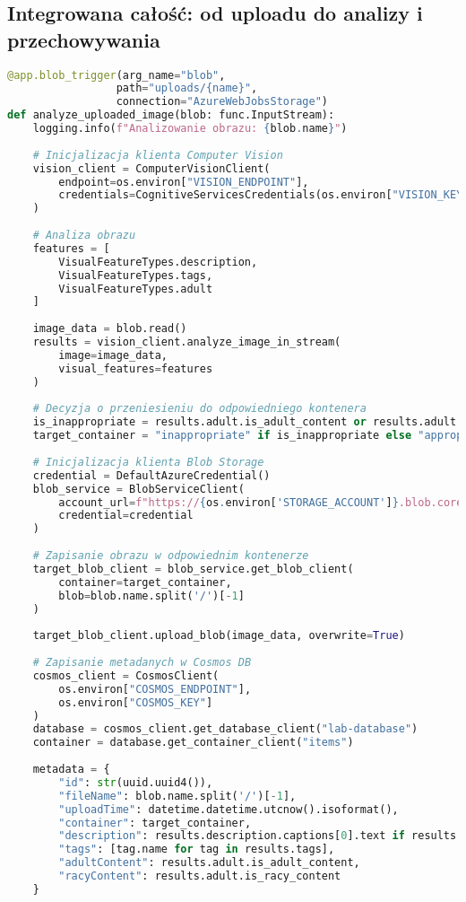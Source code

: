 \documentclass{article}
\begin{document}
\subsection{Integrowana całość: od uploadu do analizy i przechowywania}
\begin{lstlisting}[language=python]
@app.blob_trigger(arg_name="blob", 
                 path="uploads/{name}", 
                 connection="AzureWebJobsStorage")
def analyze_uploaded_image(blob: func.InputStream):
    logging.info(f"Analizowanie obrazu: {blob.name}")
    
    # Inicjalizacja klienta Computer Vision
    vision_client = ComputerVisionClient(
        endpoint=os.environ["VISION_ENDPOINT"],
        credentials=CognitiveServicesCredentials(os.environ["VISION_KEY"])
    )
    
    # Analiza obrazu
    features = [
        VisualFeatureTypes.description,
        VisualFeatureTypes.tags,
        VisualFeatureTypes.adult
    ]
    
    image_data = blob.read()
    results = vision_client.analyze_image_in_stream(
        image=image_data,
        visual_features=features
    )
    
    # Decyzja o przeniesieniu do odpowiedniego kontenera
    is_inappropriate = results.adult.is_adult_content or results.adult.is_racy_content
    target_container = "inappropriate" if is_inappropriate else "appropriate"
    
    # Inicjalizacja klienta Blob Storage
    credential = DefaultAzureCredential()
    blob_service = BlobServiceClient(
        account_url=f"https://{os.environ['STORAGE_ACCOUNT']}.blob.core.windows.net",
        credential=credential
    )
    
    # Zapisanie obrazu w odpowiednim kontenerze
    target_blob_client = blob_service.get_blob_client(
        container=target_container,
        blob=blob.name.split('/')[-1]
    )
    
    target_blob_client.upload_blob(image_data, overwrite=True)
    
    # Zapisanie metadanych w Cosmos DB
    cosmos_client = CosmosClient(
        os.environ["COSMOS_ENDPOINT"], 
        os.environ["COSMOS_KEY"]
    )
    database = cosmos_client.get_database_client("lab-database")
    container = database.get_container_client("items")
    
    metadata = {
        "id": str(uuid.uuid4()),
        "fileName": blob.name.split('/')[-1],
        "uploadTime": datetime.datetime.utcnow().isoformat(),
        "container": target_container,
        "description": results.description.captions[0].text if results.description.captions else "",
        "tags": [tag.name for tag in results.tags],
        "adultContent": results.adult.is_adult_content,
        "racyContent": results.adult.is_racy_content
    }
    

\end{lstlisting}
\end{document}

